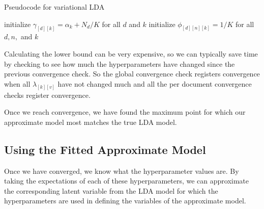 \documentclass[12pt]{article}
\begin{document}
\begin{algorithm}[H]
    \caption{Pseudocode for variational LDA}
    \DontPrintSemicolon
    initialize $\gamma_{[d][k]} = \alpha_{k} + N_{d} / K$ for all $d$ and $k$\;
    initialize $\phi_{[d][n][k]} = 1 / K$ for all $d, n,$ and $k$\;
\end{algorithm}

Calculating the lower bound can be very expensive, so we can typically save time
by checking to see how much the hyperparameters have changed since the previous
convergence check.  So the global convergence check registers convergence when
all $\lambda_{[k][v]}$ have not changed much and all the per document
convergence checks register convergence.

Once we reach convergence, we have found the maximum point for which our
approximate model most matches the true LDA model.

\subsection{Using the Fitted Approximate Model}

Once we have converged, we know what the hyperparameter values are.  By taking
the expectations of each of these hyperparameters, we can approximate the
corresponding latent variable from the LDA model for which the hyperparameters
are used in defining the variables of the approximate model.
\end{document}
